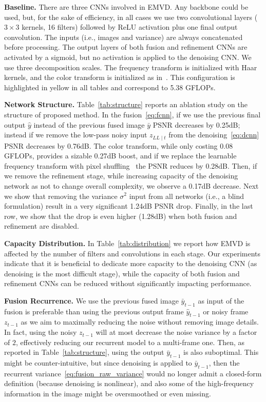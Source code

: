 \documentclass[final]{cvpr}
\newcommand{\LL}{\scriptscriptstyle{LL\mid}}
\begin{document}
    \textbf{Baseline.} There are three CNNs involved in EMVD. Any backbone could be used, but, for the sake of efficiency, in all cases we use two convolutional layers ($3\times3$ kernels, 16 filters) followed by ReLU activation plus one final output convolution. The inputs (i.e., images and variance) are always concatenated before processing. The output layers of both fusion and refinement CNNs are activated by a sigmoid, but no activation is applied to the denoising CNN. We use three decomposition scales. The frequency transform is initialized with Haar kernels, and the color transform is initialized as in~\cite{buades2020cfa}. This configuration is highlighted in yellow in all tables and correspond to 5.38 GFLOPs.
    
    \textbf{Network Structure.} Table~\ref{tab:structure} reports an ablation study on the structure of proposed method. In the fusion~\eqref{eq:fcnn}, if we use the previous final output $\hat{y}$ instead of the previous fused image $\bar{y}$ PSNR decreases by 0.25dB; instead if we remove the low-pass noisy input $z_{\LL t}$ from the denoising~\eqref{eq:dcnn} PSNR decreases by 0.76dB. The color transform, while only costing 0.08 GFLOPs, provides a sizable 0.27dB boost, and if we replace the learnable frequency transform with pixel shuffling~\cite{shu2016subpx} the PSNR reduces by 0.28dB. Then, if we remove the refinement stage, while increasing capacity of the denoising network as not to change overall complexity, we observe a 0.17dB decrease. Next we show that removing the variance $\sigma^2$ input from all networks (i.e., a blind formulation) result in a very significant 1.24dB PSNR drop. Finally, in the last row, we show that the drop is even higher (1.28dB) when both fusion and refinement are disabled.
    
    \textbf{Capacity Distribution.} In Table~\ref{tab:distribution} we report how EMVD is affected by the number of filters and convolutions in each stage. Our experiments indicate that it is beneficial to dedicate more capacity to the denoising CNN (as denoising is the most difficult stage), while the capacity of both fusion and refinement CNNs can be reduced without significantly impacting performance.

    \textbf{Fusion Recurrence.} We use the previous fused image $\bar{y}_{t-1}$ as input of the fusion is preferable than using the previous output frame $\hat{y}_{t-1}$ or noisy frame $z_{t-1}$ as we aim to maximally reducing the noise without removing image details. In fact, using the noisy $z_{t-1}$ will at most decrease the noise variance by a factor of $2$, effectively reducing our recurrent model to a multi-frame one. Then, as reported in Table~\ref{tab:structure}, using the output $\bar{y}_{t-1}$ is also suboptimal. This might be counter-intuitive, but since denoising is applied to $\bar{y}_{t-1}$, then the recurrent variance~\eqref{eq:fusion_raw_variance} would no longer admit a closed-form definition (because denoising is nonlinear), and also some of the high-frequency information in the image might be oversmoothed or even missing.
\end{document}
